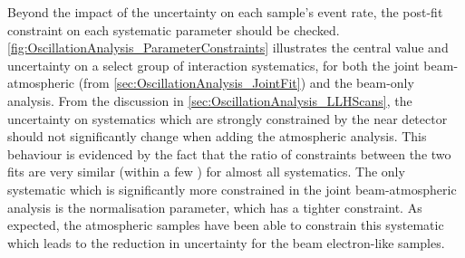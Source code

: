 Beyond the impact of the uncertainty on each sample's event rate, the post-fit constraint on each systematic parameter should be checked. \autoref{fig:OscillationAnalysis_ParameterConstraints} illustrates the central value and uncertainty on a select group of interaction systematics, for both the joint beam-atmospheric (from \autoref{sec:OscillationAnalysis_JointFit}) and the beam-only analysis. From the discussion in \autoref{sec:OscillationAnalysis_LLHScans}, the uncertainty on systematics which are strongly constrained by the near detector should not significantly change when adding the atmospheric analysis. This behaviour is evidenced by the fact that the ratio of constraints between the two fits are very similar (within a few \quickmath{\%}) for almost all systematics. The only systematic which is significantly more constrained in the joint beam-atmospheric analysis is the  normalisation parameter, which has a  tighter constraint. As expected, the atmospheric samples have been able to constrain this systematic which leads to the reduction in uncertainty for the beam electron-like samples.

